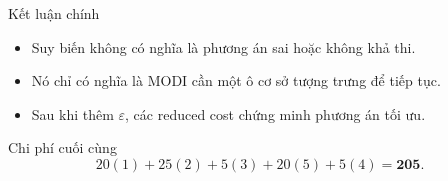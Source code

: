 \documentclass[10pt]{beamer}
\begin{document}
\begin{frame}{Kết luận chính}
    \begin{itemize}
        \item Suy biến không có nghĩa là phương án sai hoặc không khả thi.
        \item Nó chỉ có nghĩa là MODI cần một ô cơ sở tượng trưng để tiếp tục.
        \item Sau khi thêm $\varepsilon$, các reduced cost chứng minh phương án tối ưu.
    \end{itemize}

    \vspace{0.3cm}
    \begin{block}{Chi phí cuối cùng}
        \[
            20(1)+25(2)+5(3)+20(5)+5(4)=\mathbf{205}.
        \]
    \end{block}
\end{frame}
\end{document}
